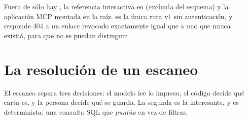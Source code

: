 Fuera de  sólo hay , la referencia
interactiva en  (excluida del esquema) y la aplicación MCP
montada en la raíz.  es la única ruta v1 sin
autenticación, y responde 404 a un enlace revocado exactamente igual que a uno
que nunca existió, para que no se puedan distinguir.

\section{La resolución de un escaneo}

El escaneo separa tres decisiones: el modelo lee lo impreso, el código decide
qué carta es, y la persona decide qué se guarda. La segunda es la interesante,
y es determinista: una consulta SQL que \emph{puntúa} en vez de filtrar.

